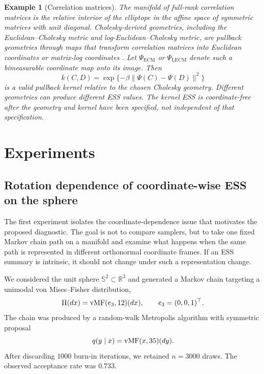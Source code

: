 \documentclass[11pt]{article}
\newtheorem{example}{Example}[section]
\newcommand{\bbS}{\mathbb{S}}
\newcommand{\1}{\mathbf{1}}
\begin{document}
\begin{example}[Correlation matrices]
The manifold of full-rank correlation matrices is the relative interior of the elliptope in the affine space of symmetric matrices with unit diagonal. Cholesky-derived geometries, including the Euclidean--Cholesky metric and log-Euclidean--Cholesky metric, are pullback geometries through maps that transform correlation matrices into Euclidean coordinates or matrix-log coordinates  \citep{thanwerdas_2022_TheoreticallyComputationallyConvenient}. Let $\Psi_{\mathrm{ECM}}$ or $\Psi_{\mathrm{LECM}}$ denote such a bimeasurable coordinate map onto its image. Then
\[
k(C,D)=\exp\{-\beta\|\Psi(C)-\Psi(D)\|^2\}
\]
is a valid pullback kernel relative to the chosen Cholesky geometry. Different geometries can produce different ESS values. The kernel ESS is coordinate-free after the geometry and kernel have been specified, not independent of that specification.
\end{example}


\section{Experiments}\label{sec:experiments}
\subsection{Rotation dependence of coordinate-wise ESS on the sphere}
\label{subsec:rotation-experiment}

The first experiment isolates the coordinate-dependence issue that motivates the proposed diagnostic.  The goal is not to compare samplers, but to take one fixed Markov chain path on a manifold and examine what happens when the same path is represented in different orthonormal coordinate frames.  If an ESS summary is intrinsic, it should not change under such a representation change.

We considered the unit sphere \(\bbS^2\subset \mathbb R^3\) and generated a Markov chain targeting a unimodal von Mises--Fisher distribution,
\[
    \Pi(dx) = {\rm vMF}(e_3,12)(dx),
    \qquad e_3=(0,0,1)^\top .
\]
The chain was produced by a random-walk Metropolis algorithm with symmetric proposal
\[
    q(y\mid x)={\rm vMF}(x,35)(dy).
\]
After discarding \(1000\) burn-in iterations, we retained \(n=3000\) draws.  The observed acceptance rate was \(0.733\).
\end{document}
